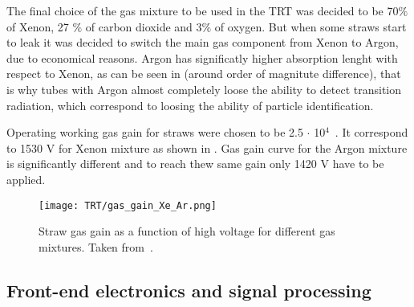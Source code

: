 The final choice of the gas mixture to be used in the TRT was decided to be 70$\%$ of Xenon, 27 $\%$ of carbon dioxide and 3$\%$ of oxygen.
But when some straws start to leak it was decided to switch the main gas component from Xenon to Argon, due to economical reasons.
Argon has significatly higher absorption lenght with respect to Xenon, as can be seen in  (around order of magnitute difference), 
that is why tubes with Argon almost completely loose the ability to detect transition radiation, 
which correspond to loosing the ability of particle identification.

Operating working gas gain for straws were chosen to be 2.5 $\cdot$ 10$^4$~\cite{ID_TDR_vol1}. It correspond to 1530 V for Xenon mixture as shown in .
Gas gain curve for the Argon mixture is significantly different and to reach thew same gain only 1420 V have to be applied.

\begin{figure}
\centering
\texttt{[image: TRT/gas\_gain\_Xe\_Ar.png]}
\caption{ 
Straw gas gain as a function of high voltage for different gas mixtures. Taken from~\cite{Abat:2008zza}.
}
\label{fig:gas_gain}
\end{figure}



\subsection{Front-end electronics and signal processing}
\label{subsubsec:front_end_electronics}


